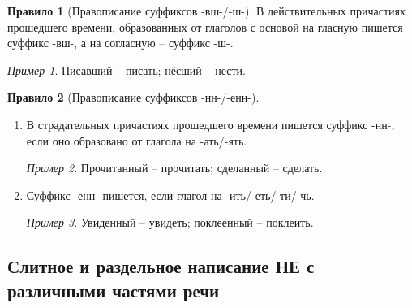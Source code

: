\documentclass[12pt]{article}
\theoremstyle{definition}
\newtheorem{rrule}{Правило}[section]
\theoremstyle{remark}
\newtheorem*{example}{Пример}
\begin{document}
\begin{rrule}[Правописание суффиксов -вш-/-ш-]
    В действительных причастиях прошедшего времени, образованных от глаголов с основой на гласную пишется суффикс -вш-, а на согласную -- суффикс -ш-.
    \begin{example}
        Писавший -- писать; нёсший -- нести.
    \end{example}
\end{rrule}

\begin{rrule}[Правописание суффиксов -нн-/-енн-]
    \hfill
    \begin{enumerate}
        \item В страдательных причастиях прошедшего времени пишется суффикс -нн-, если оно образовано от глагола на -ать/-ять.
        \begin{example}
            Прочитанный -- прочитать; сделанный -- сделать.
        \end{example}
        \item Суффикс -енн- пишется, если глагол на -ить/-еть/-ти/-чь.
        \begin{example}
            Увиденный -- увидеть; поклеенный -- поклеить.
        \end{example}
    \end{enumerate}
\end{rrule}

\subsection{Слитное и раздельное написание НЕ с различными частями речи}
\end{document}
